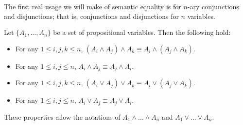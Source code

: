 The first real usage we will make of semantic equality
is for \(n\)-ary conjunctions and disjunctions;
that is, conjunctions and disjunctions for \(n\) variables.

\begin{proposition}
    Let \(\{A_1,\ldots,A_n\}\) be a set of propositional variables.
    Then the following hold:
    \begin{itemize}
        \item For any \(1\le i,j,k\le n\),
        \((A_i\wedge A_j)\wedge A_k\equiv A_i\wedge(A_j\wedge A_k)\).
        \item For any \(1\le i,j\le n\),
        \(A_i\wedge A_j\equiv A_j\wedge A_i\).
        \item For any \(1\le i,j,k\le n\),
        \((A_i\vee A_j)\vee A_k\equiv A_i\vee(A_j\vee A_k)\).
        \item For any \(1\le i,j\le n\),
        \(A_i\vee A_j\equiv A_j\vee A_i\).
    \end{itemize}
    These properties allow the notations of
    \(A_1\wedge\dots\wedge A_n\) and \(A_1\vee\dots\vee A_n\).
\end{proposition}
